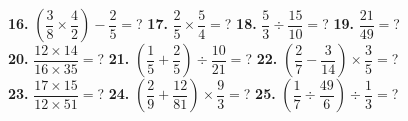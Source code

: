 \documentclass[a4paper]{article}
\newcommand{\lr}[1]{\left({#1}\right)} %
\begin{document}
\begin{Large}
\textbf{16.} $\lr{\dfrac{3}{8} \times \dfrac{4}{2}} - \dfrac{2}{5}=$? \hspace{0.3cm}
\textbf{17.} $\dfrac{2}{5} \times \dfrac{5}{4}=$? \hspace{0.3cm}
\textbf{18.} $\dfrac{5}{3} \div \dfrac{15}{10}=$? \hspace{0.3cm}
\textbf{19.} $\dfrac{21}{49}=$? \\[0.75cm]
\textbf{20.} $\dfrac{12 \times 14}{16 \times 35}=$? \hspace{0.3cm}
\textbf{21.} $\lr{\dfrac{1}{5} + \dfrac{2}{5}} \div \dfrac{10}{21}=$? \hspace{0.3cm}
\textbf{22.} $\lr{\dfrac{2}{7} - \dfrac{3}{14}} \times \dfrac{3}{5}=$? \\[0.75cm]
\textbf{23.} $\dfrac{17 \times 15}{12 \times 51}=$?  \hspace{0.3cm}
\textbf{24.} $\lr{\dfrac{2}{9} + \dfrac{12}{81}} \times \dfrac{9}{3}=$? \hspace{0.3cm}
\textbf{25.} $\lr{\dfrac{1}{7} \div \dfrac{49}{6}} \div \dfrac{1}{3}=$? 

\end{Large}
\end{document}
